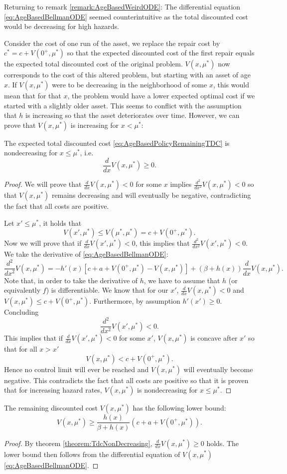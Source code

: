 	Returning to remark \ref{remark:AgeBasedWeirdODE}:
	The differential equation \eqref{eq:AgeBasedBellmanODE} seemed counterintuitive as the total discounted cost would be decreasing for high hazards.
	
	Consider the cost of one run of the asset, we replace the repair cost by $c^*=c+V(0^+,\mu^*)$ so that the expected discounted cost of the first repair equals the expected total discounted cost of the original problem.
	$V(x,\mu^*)$ now corresponds to the cost of this altered problem, but starting with an asset of age $x$.
	If $V(x,\mu^*)$ were to be decreasing in the neighborhood of some $x$, this would mean that for that $x$, the problem would have a lower expected optimal cost if we started with a slightly older asset.
	This seems to conflict with the assumption that $h$ is increasing so that the asset deteriorates over time.
	However, we can prove that $V(x,\mu^*)$ is increasing for $x<\mu^*$:

\begin{theorem}\label{theorem:TdcNonDecreasing}
	The expected total discounted cost \eqref{eq:AgeBasedPolicyRemainingTDC} is nondecreasing for $x\leq \mu^*$, i.e.
	\[
	\frac{d}{dx}V(x,\mu^*)\geq 0.
	\]
	\begin{proof}
		We will prove that $\frac{d}{dx}V(x,\mu^*)<0$ for some $x$ implies $\frac{d^2}{dx^2}V(x,\mu^*)<0$ so that $V(x,\mu^*)$ remains decreasing and will eventually be negative, contradicting the fact that all costs are positive.
		
		Let $x'\leq\mu^*$, it holds that
		\[
		V(x',\mu^*)\leq V(\mu^*,\mu^*)=c+V(0^+,\mu^*).
		\]
		Now we will prove that if $\frac{d}{dx}V(x',\mu^*)< 0$, this implies that $\frac{d^2}{dx^2}V(x',\mu^*)<0$.
		We take the derivative of \eqref{eq:AgeBasedBellmanODE}:
		\[
		\frac{d^2}{dx^2}V(x,\mu^*)=-h'(x)[c+a+V(0^+,\mu^*)-V(x,\mu^*)]+(\beta+h(x))\frac{d}{dx}V(x,\mu^*).
		\]
		Note that, in order to take the derivative of $h$, we have to assume that $h$ (or equivalently $f$) is differentiable.
		We know that for our $x'$, $\frac{d}{dx}V(x,\mu^*)< 0$ and $V(x,\mu^*)\leq c+V(0^+,\mu^*)$.
		Furthermore, by assumption $h'(x')\geq 0$.
		Concluding
		\[
		\frac{d^2}{dx^2}V(x',\mu^*)<0.
		\]
		This implies that if $\frac{d}{dx}V(x',\mu^*)<0$ for some $x'$, $V(x,\mu^*)$ is concave after $x'$ so that for all $x>x'$
		\[
		V(x,\mu^*)< c+V(0^+,\mu^*).
		\]
		Hence no control limit will ever be reached and $V(x,\mu^*)$ will eventually become negative.
		This contradicts the fact that all costs are positive so that it is proven that for increasing hazard rates, $V(x,\mu^*)$ is nondecreasing for $x\leq\mu^*$.
	\end{proof}
\end{theorem}

\begin{corollary}
	The remaining discounted cost $V(x,\mu^*)$ has the following lower bound:
	\[
	V(x,\mu^*)\geq\frac{h(x)}{\beta+ h(x)}(c+a+ V(0^+,\mu^*)).
	\]
	\begin{proof}
		By theorem \ref{theorem:TdcNonDecreasing}, $\frac{d}{dx}V(x,\mu^*)\geq 0$ holds.
		The lower bound then follows from the differential equation of $V(x,\mu^*)$ \ref{eq:AgeBasedBellmanODE}.
	\end{proof}
\end{corollary}